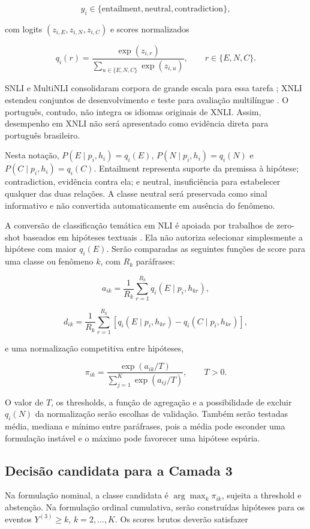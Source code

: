 \[
y_i\in\{\text{entailment},\text{neutral},\text{contradiction}\},
\]

com logits \((z_{i,E},z_{i,N},z_{i,C})\) e scores normalizados

\[
q_i(r)=\frac{\exp(z_{i,r})}{\sum_{u\in\{E,N,C\}}\exp(z_{i,u})},
\qquad r\in\{E,N,C\}.
\]

SNLI e MultiNLI consolidaram corpora de grande escala para essa tarefa \cite{bowman2015,williams2018}; XNLI estendeu conjuntos de desenvolvimento e teste para avaliação multilíngue \cite{conneau2018xnli}. O português, contudo, não integra os idiomas originais de XNLI. Assim, desempenho em XNLI não será apresentado como evidência direta para português brasileiro.

Nesta notação, \(P(E\mid p_i,h_i)=q_i(E)\), \(P(N\mid p_i,h_i)=q_i(N)\) e \(P(C\mid p_i,h_i)=q_i(C)\). Entailment representa suporte da premissa à hipótese; contradiction, evidência contra ela; e neutral, insuficiência para estabelecer qualquer das duas relações. A classe neutral será preservada como sinal informativo e não convertida automaticamente em ausência do fenômeno.

A conversão de classificação temática em NLI é apoiada por trabalhos de zero-shot baseados em hipóteses textuais \cite{yin2019,laurer2024}. Ela não autoriza selecionar simplesmente a hipótese com maior \(q_i(E)\). Serão comparadas as seguintes funções de score para uma classe ou fenômeno \(k\), com \(R_k\) paráfrases:

\[
a_{ik}=\frac{1}{R_k}\sum_{r=1}^{R_k}q_i(E\mid p_i,h_{kr}),
\]

\[
d_{ik}=\frac{1}{R_k}\sum_{r=1}^{R_k}
\left[q_i(E\mid p_i,h_{kr})-q_i(C\mid p_i,h_{kr})\right],
\]

e uma normalização competitiva entre hipóteses,

\[
\pi_{ik}=\frac{\exp(a_{ik}/T)}{\sum_{j=1}^{K}\exp(a_{ij}/T)},
\qquad T>0.
\]

O valor de \(T\), os thresholds, a função de agregação e a possibilidade de excluir \(q_i(N)\) da normalização serão escolhas de validação. Também serão testadas média, mediana e mínimo entre paráfrases, pois a média pode esconder uma formulação instável e o máximo pode favorecer uma hipótese espúria.

\subsection{Decisão candidata para a Camada 3}

Na formulação nominal, a classe candidata é \(\arg\max_k\pi_{ik}\), sujeita a threshold e abstenção. Na formulação ordinal cumulativa, serão construídas hipóteses para os eventos \(Y^{(3)}\geq k\), \(k=2,\ldots,K\). Os scores brutos deverão satisfazer

